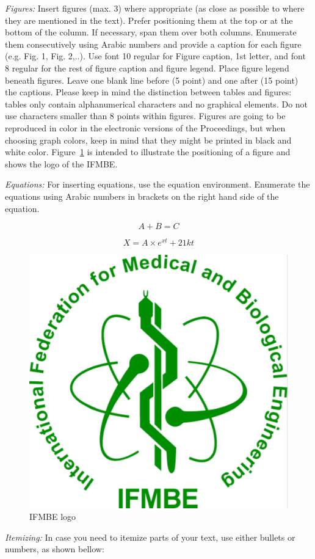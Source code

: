 \textit{Figures:} Insert figures (max. 3) where appropriate (as close as possible
to where they are mentioned in the text). Prefer positioning them at the
top or at the bottom of the column. If necessary, span them over both
columns. Enumerate them consecutively using Arabic numbers and provide a
caption for each figure (e.g. Fig. 1, Fig. 2,..). Use font 10 regular
for Figure caption, 1st letter, and font 8 regular for the rest of
figure caption and figure legend. Place figure legend beneath figures.
Leave one blank line before (5 point) and one after (15 point) the
captions. Please keep in mind the distinction between tables and
figures: tables only contain alphanumerical characters and no graphical
elements. Do not use characters smaller than 8 points within figures.
Figures are going to be reproduced in color in the electronic versions
of the Proceedings, but when choosing graph colors, keep in mind that
they might be printed in black and white color. Figure~\ref{figure1} is
intended to illustrate the positioning of a figure and shows the logo of
the IFMBE.

\textit{Equations:} For inserting equations, use the equation
environment. Enumerate the equations using Arabic numbers in brackets on
the right hand side of the equation.

\begin{equation}
A+B=C
\end{equation}

\begin{equation}
X=A\times e^{xt}+21kt
\end{equation}

\begin{figure}[ht]
      \centering
          \includegraphics[width=0.5\columnwidth]{figures/ifmbe.pdf}
      \caption{IFMBE logo}
      \label{figure1}
\end{figure}


\textit{Itemizing:} In case you need to itemize parts of your text, use
either bullets or numbers, as shown bellow:

